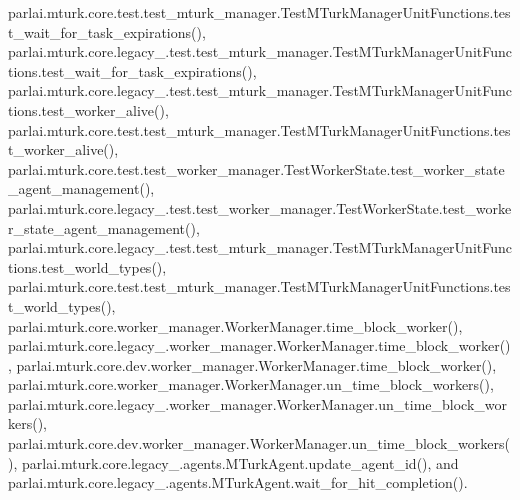parlai.\+mturk.\+core.\+test.\+test\+\_\+mturk\+\_\+manager.\+Test\+M\+Turk\+Manager\+Unit\+Functions.\+test\+\_\+wait\+\_\+for\+\_\+task\+\_\+expirations(), parlai.\+mturk.\+core.\+legacy\+\_.\+test.\+test\+\_\+mturk\+\_\+manager.\+Test\+M\+Turk\+Manager\+Unit\+Functions.\+test\+\_\+wait\+\_\+for\+\_\+task\+\_\+expirations(), parlai.\+mturk.\+core.\+legacy\+\_.\+test.\+test\+\_\+mturk\+\_\+manager.\+Test\+M\+Turk\+Manager\+Unit\+Functions.\+test\+\_\+worker\+\_\+alive(), parlai.\+mturk.\+core.\+test.\+test\+\_\+mturk\+\_\+manager.\+Test\+M\+Turk\+Manager\+Unit\+Functions.\+test\+\_\+worker\+\_\+alive(), parlai.\+mturk.\+core.\+test.\+test\+\_\+worker\+\_\+manager.\+Test\+Worker\+State.\+test\+\_\+worker\+\_\+state\+\_\+agent\+\_\+management(), parlai.\+mturk.\+core.\+legacy\+\_.\+test.\+test\+\_\+worker\+\_\+manager.\+Test\+Worker\+State.\+test\+\_\+worker\+\_\+state\+\_\+agent\+\_\+management(), parlai.\+mturk.\+core.\+legacy\+\_.\+test.\+test\+\_\+mturk\+\_\+manager.\+Test\+M\+Turk\+Manager\+Unit\+Functions.\+test\+\_\+world\+\_\+types(), parlai.\+mturk.\+core.\+test.\+test\+\_\+mturk\+\_\+manager.\+Test\+M\+Turk\+Manager\+Unit\+Functions.\+test\+\_\+world\+\_\+types(), parlai.\+mturk.\+core.\+worker\+\_\+manager.\+Worker\+Manager.\+time\+\_\+block\+\_\+worker(), parlai.\+mturk.\+core.\+legacy\+\_.\+worker\+\_\+manager.\+Worker\+Manager.\+time\+\_\+block\+\_\+worker(), parlai.\+mturk.\+core.\+dev.\+worker\+\_\+manager.\+Worker\+Manager.\+time\+\_\+block\+\_\+worker(), parlai.\+mturk.\+core.\+worker\+\_\+manager.\+Worker\+Manager.\+un\+\_\+time\+\_\+block\+\_\+workers(), parlai.\+mturk.\+core.\+legacy\+\_.\+worker\+\_\+manager.\+Worker\+Manager.\+un\+\_\+time\+\_\+block\+\_\+workers(), parlai.\+mturk.\+core.\+dev.\+worker\+\_\+manager.\+Worker\+Manager.\+un\+\_\+time\+\_\+block\+\_\+workers(), parlai.\+mturk.\+core.\+legacy\+\_.\+agents.\+M\+Turk\+Agent.\+update\+\_\+agent\+\_\+id(), and parlai.\+mturk.\+core.\+legacy\+\_.\+agents.\+M\+Turk\+Agent.\+wait\+\_\+for\+\_\+hit\+\_\+completion().

\mbox{\label{classparlai_1_1mturk_1_1core_1_1dev_1_1worker__manager_1_1WorkerManager_abb50897c2ac34971c1593cab077df63a}} 
